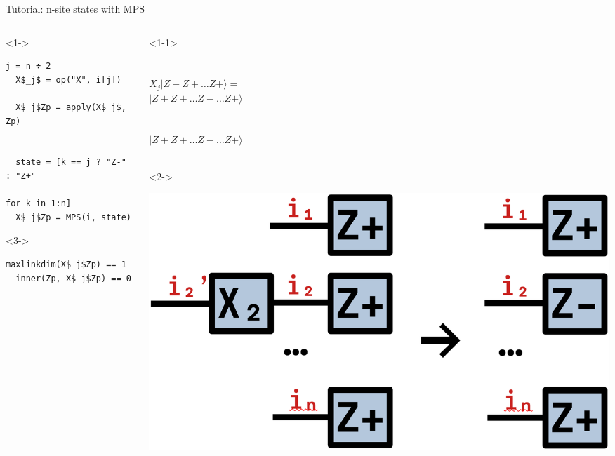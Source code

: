 \begin{frame}[fragile]{Tutorial: n-site states with MPS}

\begin{columns}

\begin{column}{6cm}

\begin{onlyenv}<1->
\begin{lstlisting}[language=JuliaLocal, style=julia, mathescape, basicstyle=\scriptsize\ttfamily]
  j = n ÷ 2
  X$_j$ = op("X", i[j])

  X$_j$Zp = apply(X$_j$, Zp)


  state = [k == j ? "Z-" : "Z+"
                           for k in 1:n]
  X$_j$Zp = MPS(i, state)
\end{lstlisting}
\end{onlyenv}

\begin{onlyenv}<3->
\begin{lstlisting}[language=JuliaLocal, style=julia, mathescape, basicstyle=\scriptsize\ttfamily]
  maxlinkdim(X$_j$Zp) == 1
  inner(Zp, X$_j$Zp) == 0
\end{lstlisting}
\end{onlyenv}

\end{column}

\begin{column}{4.5cm}

\begin{onlyenv}<1-1>
~\\
~\\
~\\
$X_j|Z+Z+\dots Z+\rangle =$ \\
$|Z+Z+\dots Z-\dots Z+\rangle$ \\
~\\
~\\
$|Z+Z+\dots Z-\dots Z+\rangle$ \\
~\\
\end{onlyenv}

\begin{onlyenv}<2->
\vspace*{0.0cm}
\begin{center}
\includegraphics[width=1.0\textwidth]{
  slides/assets/XjZpn.png
}
\end{center}
\vspace*{0.0cm}
\end{onlyenv}


\end{column}
\end{columns}
\end{frame}
